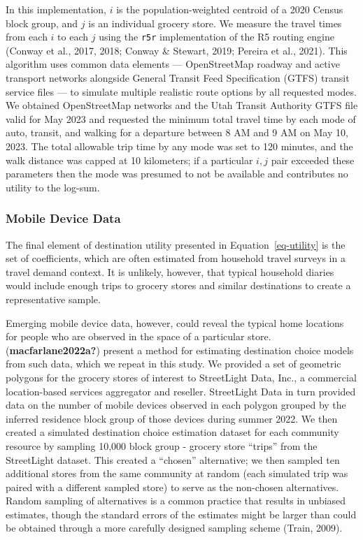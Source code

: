 \documentclass[
  letterpaper,
  number,
  review,
  doubleblind,
  3p]{elsarticle}
\begin{document}
In this implementation, \(i\) is the population-weighted centroid of a
2020 Census block group, and \(j\) is an individual grocery store. We
measure the travel times from each \(i\) to each \(j\) using the
\texttt{r5r} implementation of the R5 routing engine (Conway et al.,
2017, 2018; Conway \& Stewart, 2019; Pereira et al., 2021). This
algorithm uses common data elements --- OpenStreetMap roadway and active
transport networks alongside General Transit Feed Specification (GTFS)
transit service files --- to simulate multiple realistic route options
by all requested modes. We obtained OpenStreetMap networks and the Utah
Transit Authority GTFS file valid for May 2023 and requested the minimum
total travel time by each mode of auto, transit, and walking for a
departure between 8 AM and 9 AM on May 10, 2023. The total allowable
trip time by any mode was set to 120 minutes, and the walk distance was
capped at 10 kilometers; if a particular \(i,j\) pair exceeded these
parameters then the mode was presumed to not be available and
contributes no utility to the log-sum.

\subsubsection{Mobile Device Data}\label{mobile-device-data}

The final element of destination utility presented in
Equation~\ref{eq-utility} is the set of coefficients, which are often
estimated from household travel surveys in a travel demand context. It
is unlikely, however, that typical household diaries would include
enough trips to grocery stores and similar destinations to create a
representative sample.

Emerging mobile device data, however, could reveal the typical home
locations for people who are observed in the space of a particular
store. (\textbf{macfarlane2022a?}) present a method for estimating
destination choice models from such data, which we repeat in this study.
We provided a set of geometric polygons for the grocery stores of
interest to StreetLight Data, Inc., a commercial location-based services
aggregator and reseller. StreetLight Data in turn provided data on the
number of mobile devices observed in each polygon grouped by the
inferred residence block group of those devices during summer 2022. We
then created a simulated destination choice estimation dataset for each
community resource by sampling 10,000 block group - grocery store
``trips'' from the StreetLight dataset. This created a ``chosen''
alternative; we then sampled ten additional stores from the same
community at random (each simulated trip was paired with a different
sampled store) to serve as the non-chosen alternatives. Random sampling
of alternatives is a common practice that results in unbiased estimates,
though the standard errors of the estimates might be larger than could
be obtained through a more carefully designed sampling scheme (Train,
2009).
\end{document}

